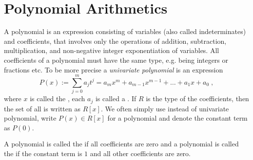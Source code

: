 \section{Polynomial Arithmetics}
A polynomial is an expression consisting of variables (also called indeterminates) and coefficients, that involves only the operations of addition, subtraction, multiplication, and non-negative integer exponentiation of variables. All coefficients of a polynomial must have the same type, e.g. being integers or fractions etc. To be more precise a \textit{univariate polynomial} is an expression
\begin{equation}
P(x) := \sum _{j = 0} ^{m}{a} _{j}{t} ^{j} ={a} _{m}x^m +{a} _{m-1} x^{m-1} + \dots + a_1 x + a_0 \;,
\end{equation}
where $x$ is called the , each $ a_j$ is called a . If $R$ is the type of the coefficients, then the set of all  is written as $R[x]$. We often simply use  instead of univariate polynomial, write $ P (x) \in R[x]$ for a polynomial and denote the constant term as $ P(0)$. 

A polynomial is called the  if all coefficients are zero and a polynomial is called the  if the constant term is $1$ and all other coefficients are zero.

